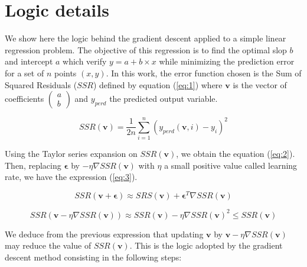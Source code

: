 \documentclass{article}
\begin{document}
\section{Logic details}
We show here the logic behind the gradient descent applied to a simple linear regression problem. The objective of this regression is to find the optimal slop \(b\) and intercept \(a\) which verify \(y = a + b \times x\) while minimizing the prediction error for a set of \(n\) points \((x,y)\). In this work, the error function chosen is the Sum of Squared Residuals (\(SSR\)) defined by equation (\ref{eq:1}) where \(\mathbf{v}\) is the vector of coefficients  $\begin{pmatrix}
  a \\ 
  b 
\end{pmatrix}$  and \(y_{perd}\) the predicted output variable. 

\begin{equation} \label{eq:1}
SSR(\mathbf{v}) = \frac{1}{2n}\sum_{i=1}^{n}(y_{perd}(\mathbf{v}, i)-y_{i})^{2}
\end{equation}

Using the Taylor series expansion on \(SSR(\mathbf{v})\), we obtain the equation  (\ref{eq:2}). Then, replacing \(\mathbf{\epsilon}\) by \(-\eta\nabla SSR(\mathbf{v})\) with \(\eta\) a small positive value called learning rate, we have the expression (\ref{eq:3}). 

\begin{equation} \label{eq:2}
    SSR(\mathbf{v} + \mathbf{\epsilon}) \approx SRS(\mathbf{v}) + \mathbf{\epsilon}^{T}\nabla SSR(\mathbf{v})
\end{equation}

\begin{equation} \label{eq:3}
    SSR(\mathbf{v} - \eta\nabla SSR(\mathbf{v})) \approx SSR(\mathbf{v}) - \eta\nabla SSR(\mathbf{v})^{2} \leq SSR(\mathbf{v})
\end{equation}

We deduce from the previous expression that updating \(\mathbf{v}\) by \(\mathbf{v} - \eta\nabla SSR(\mathbf{v})\) may reduce the value of \(SSR(\mathbf{v})\). This is the logic adopted by the gradient descent method consisting in the following steps: 
\end{document}
